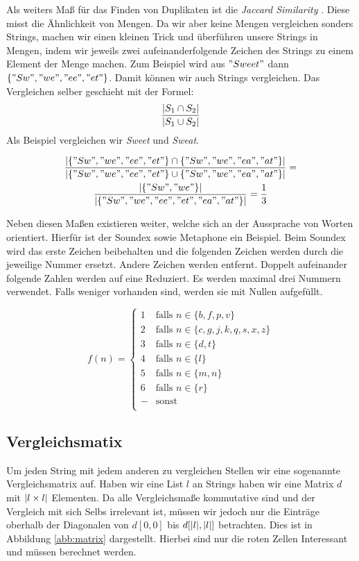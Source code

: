 \documentclass[sigconf]{acmart}
\DeclarePairedDelimiter\abs{\lvert}{\rvert}
\begin{document}
Als weiters Maß für das Finden von Duplikaten ist die
\emph{Jaccard Similarity} \cite[Vgl. 4.1.1]{theobald2008spotsigs}. Diese misst die Ähnlichkeit von Mengen.
Da wir aber keine Mengen vergleichen sonders Strings, machen wir einen
kleinen Trick und überführen unsere Strings in Mengen, indem wir
jeweils zwei aufeinanderfolgende Zeichen des Strings zu einem Element
der Menge machen. Zum Beispiel wird aus $"Sweet"$ dann
$\{"Sw", "we", "ee", "et" \}$. Damit können wir auch Strings vergleichen.
Das Vergleichen selber geschieht mit der Formel:
$$\frac{\abs{S_1 \cap S_2}}{\abs{S_1 \cup S_2}}$$
Als Beispiel vergleichen wir \emph{Sweet} und \emph{Sweat}.

\begin{gather*}
  \frac{
    \abs{\{"Sw", "we", "ee", "et" \} \cap \{"Sw", "we", "ea", "at" \}}
  }{
    \abs{\{"Sw", "we", "ee", "et" \} \cup \{"Sw", "we", "ea", "at" \}}
  }
  = \\
  \frac{
    \abs{\{"Sw", "we"\}}
  }{
    \abs{\{"Sw", "we", "ee", "et", "ea", "at" \}}
  }
  = 
  \frac{1}{3}
\end{gather*}

Neben diesen Maßen existieren weiter, welche sich an der
Aussprache von Worten orientiert. Hierfür ist der Soundex \cite[Vlg. S. 5]{elmagarmid1}
sowie Metaphone \cite[Vlg. S. 5]{elmagarmid1} ein Beispiel.
Beim Soundex wird das erste Zeichen beibehalten und die folgenden
Zeichen werden durch die jeweilige Nummer ersetzt. Andere Zeichen werden
entfernt. Doppelt aufeinander folgende Zahlen werden auf eine Reduziert.
Es werden maximal drei Nummern verwendet. Falls weniger vorhanden sind,
werden sie mit Nullen aufgefüllt.


\[ f(n) =
  \begin{cases}
    1      & \text{falls } n \in \{b,f,p,v\}\\
    2      & \text{falls } n \in \{c,g,j,k,q,s,x,z\}\\
    3      & \text{falls } n \in \{d,t\}\\
    4      & \text{falls } n \in \{l\}\\
    5      & \text{falls } n \in \{m,n\}\\
    6      & \text{falls } n \in \{r\}\\
    -     & \text{sonst }\\
  \end{cases}
\]




\subsection*{Vergleichsmatix}
Um jeden String mit jedem anderen zu vergleichen Stellen wir eine
sogenannte Vergleichsmatrix auf. Haben wir eine List $l$ an Strings
haben wir eine Matrix $d$ mit $\abs{l\times l}$ Elementen. Da alle
Vergleichsmaße kommutative sind und der Vergleich mit sich Selbs
irrelevant ist, müssen wir jedoch nur die Einträge oberhalb der
Diagonalen von $d[0,0]$ bis $d[\abs{l}, \abs{l}]$ betrachten.
Dies ist in Abbildung \ref{abb:matrix} dargestellt. Hierbei
sind nur die roten Zellen Interessant und müssen berechnet werden.
\end{document}
